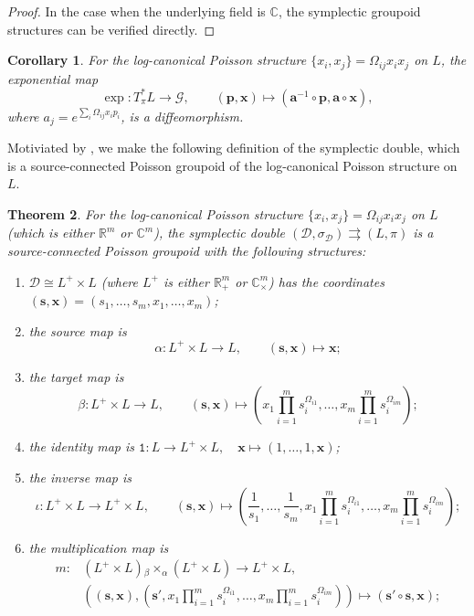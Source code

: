 \documentclass{amsart}
\newtheorem{theorem}{Theorem}[section]
\newtheorem{corollary}[theorem]{Corollary}
\numberwithin{equation}{section}
\newcommand{\bfa}{{\boldsymbol{a}}}
\newcommand{\bfp}{{\boldsymbol{p}}}
\newcommand{\bfs}{{\boldsymbol{s}}}
\newcommand{\bfx}{{\boldsymbol{x}}}
\newcommand{\cD}{\mathcal{D}}
\newcommand{\cG}{\mathcal{G}}
\newcommand{\CC}{\mathbb{C}}
\newcommand{\RR}{\mathbb{R}}
\newcommand{\rra}{\rightrightarrows}
\begin{document}
\begin{proof}
  In the case when the underlying field is $\CC$, the symplectic groupoid structures can be verified directly.
\end{proof}

\begin{corollary} \label{cor:exp}
  For the log-canonical Poisson structure $\{x_i, x_j\} = \Omega_{ij} x_i x_j$ on $L$, the exponential map
  \[\exp: T^*_\pi L \to \cG, \qquad (\bfp, \bfx) \mapsto \left(\bfa^{-1} \circ \bfp, \bfa \circ \bfx \right),\]
  where $a_j = e^{\sum_i \Omega_{ij} x_ip_i}$, is a diffeomorphism.
\end{corollary}

Motiviated by \cite{FG09c}, we make the following definition of the symplectic double, which is a source-connected Poisson groupoid of the log-canonical Poisson structure on $L$.
\begin{theorem} \label{thm:SymDBLoc}
  \cite{FG09c}
  For the log-canonical Poisson structure $\{x_i, x_j\} = \Omega_{ij} x_i x_j$ on $L$ (which is either $\RR^m$ or $\CC^m$), the \emph{symplectic double} $(\cD, \sigma_\cD) \rra (L, \pi)$ is a source-connected Poisson groupoid with the following structures:
  \begin{enumerate}
    \item $\cD \cong L^+ \times L$ (where $L^+$ is either $\RR_+^m$ or $\CC_\times^m$) has the coordinates $(\bfs, \bfx) = (s_1, \ldots, s_m, x_1, \ldots, x_m)$;
    \item the source map is
      \[\alpha: L^+ \times L \to L, \qquad (\bfs, \bfx) \mapsto \bfx;\]
    \item the target map is
      \[\beta: L^+ \times L \to L, \qquad (\bfs, \bfx) \mapsto \left(x_1 \prod_{i=1}^m s_i^{\Omega_{i1}}, \ldots, x_m \prod_{i=1}^m s_i^{\Omega_{im}}\right);\]
    \item the identity map is $\mathtt{1}: L \to L^+ \times L, \quad \bfx \mapsto (1, \ldots, 1, \bfx)$;
    \item the inverse map is
      \[\iota: L^+ \times L \to L^+ \times L, \qquad (\bfs, \bfx) \mapsto \left(\frac{1}{s_1}, \ldots, \frac{1}{s_m}, x_1 \prod_{i=1}^m s_i^{\Omega_{i1}}, \ldots, x_m \prod_{i=1}^m s_i^{\Omega_{im}}\right);\]
    \item the multiplication map is
      \[\begin{aligned}
	  m: & \left(L^+ \times L\right) {_\beta \times_\alpha} \left(L^+ \times L\right) \to L^+ \times L, \\
	     & \left((\bfs, \bfx), \left(\bfs', x_1 \prod_{i=1}^m s_i^{\Omega_{i1}}, \ldots, x_m \prod_{i=1}^m s_i^{\Omega_{im}}\right)\right) \mapsto (\bfs' \circ \bfs, \bfx );

\end{aligned}\]
\end{enumerate}
\end{theorem}
\end{document}
